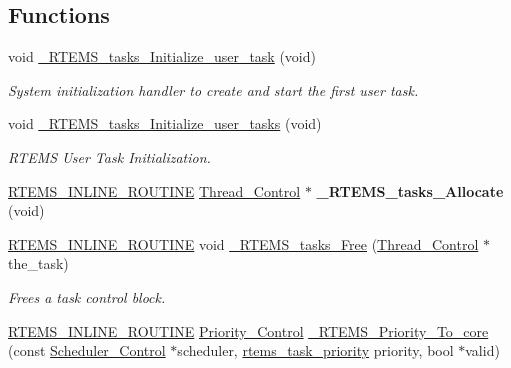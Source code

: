 \subsection*{Functions}
\begin{DoxyCompactItemize}
\item 
\mbox{\label{group__ClassicTasksImpl_gac2c1ab4bf7c8768a39084976a8d9f669}} 
void \mbox{\hyperlink{group__ClassicTasksImpl_gac2c1ab4bf7c8768a39084976a8d9f669}{\+\_\+\+R\+T\+E\+M\+S\+\_\+tasks\+\_\+\+Initialize\+\_\+user\+\_\+task}} (void)
\begin{DoxyCompactList}\small\item\em System initialization handler to create and start the first user task. \end{DoxyCompactList}\item 
void \mbox{\hyperlink{group__ClassicTasksImpl_gaff2d060c5f1c2097e1cb9d844903ea02}{\+\_\+\+R\+T\+E\+M\+S\+\_\+tasks\+\_\+\+Initialize\+\_\+user\+\_\+tasks}} (void)
\begin{DoxyCompactList}\small\item\em R\+T\+E\+MS User Task Initialization. \end{DoxyCompactList}\item 
\mbox{\label{group__ClassicTasksImpl_ga2a548ef59576b03d7f143e4cf42b0c40}} 
\mbox{\hyperlink{group__RTEMSScoreBaseDefs_gac216239df231d5dbd15e3520b0b9313f}{R\+T\+E\+M\+S\+\_\+\+I\+N\+L\+I\+N\+E\+\_\+\+R\+O\+U\+T\+I\+NE}} \mbox{\hyperlink{struct__Thread__Control}{Thread\+\_\+\+Control}} $\ast$ {\bfseries \+\_\+\+R\+T\+E\+M\+S\+\_\+tasks\+\_\+\+Allocate} (void)
\item 
\mbox{\hyperlink{group__RTEMSScoreBaseDefs_gac216239df231d5dbd15e3520b0b9313f}{R\+T\+E\+M\+S\+\_\+\+I\+N\+L\+I\+N\+E\+\_\+\+R\+O\+U\+T\+I\+NE}} void \mbox{\hyperlink{group__ClassicTasksImpl_ga3d8f1c033065071a99b447c7c0d10c39}{\+\_\+\+R\+T\+E\+M\+S\+\_\+tasks\+\_\+\+Free}} (\mbox{\hyperlink{struct__Thread__Control}{Thread\+\_\+\+Control}} $\ast$the\+\_\+task)
\begin{DoxyCompactList}\small\item\em Frees a task control block. \end{DoxyCompactList}\item 
\mbox{\hyperlink{group__RTEMSScoreBaseDefs_gac216239df231d5dbd15e3520b0b9313f}{R\+T\+E\+M\+S\+\_\+\+I\+N\+L\+I\+N\+E\+\_\+\+R\+O\+U\+T\+I\+NE}} \mbox{\hyperlink{group__RTEMSScorePriority_ga59d02b58072d31a9a1cfe644557aefe2}{Priority\+\_\+\+Control}} \mbox{\hyperlink{group__ClassicTasksImpl_ga2247dd50918001f83fd1d6850649c75c}{\+\_\+\+R\+T\+E\+M\+S\+\_\+\+Priority\+\_\+\+To\+\_\+core}} (const \mbox{\hyperlink{struct__Scheduler__Control}{Scheduler\+\_\+\+Control}} $\ast$scheduler, \mbox{\hyperlink{group__ClassicTasks_gaa80a0c0938307d1e99d0eb5fee765b47}{rtems\+\_\+task\+\_\+priority}} priority, bool $\ast$valid)

\end{DoxyCompactItemize}
